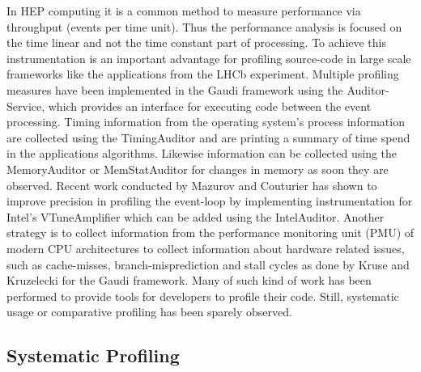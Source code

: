 \documentclass[a4paper]{jpconf}
\begin{document}
In HEP computing it is a common method to measure performance via throughput (events per time unit). Thus the performance analysis is focused on the time linear and not the time constant part of processing. To achieve this instrumentation is an important advantage for profiling source-code in large scale frameworks like the applications from the LHCb experiment. Multiple profiling measures have been implemented in the Gaudi framework using the Auditor-Service, which provides an interface for executing code between the event processing.
\newline
Timing information from the operating system's process information are collected using the TimingAuditor and are printing a summary of time spend in the applications algorithms. Likewise information can be collected using the MemoryAuditor or MemStatAuditor for changes in memory as soon they are observed. Recent work \cite{intel_auditor} conducted by Mazurov and Couturier has shown to improve precision in profiling the event-loop by implementing instrumentation for Intel's  VTune\texttrademark Amplifier which can be added using the IntelAuditor. Another strategy is to collect information from the performance monitoring unit (PMU) of modern CPU architectures to collect information about hardware related issues, such as cache-misses, branch-misprediction and stall cycles as done by Kruse and Kruzelecki \cite{modular_monitoring} for the Gaudi framework.
\newline
Many of such kind of work has been performed to provide tools for developers to profile their code. Still, systematic usage or comparative profiling has been sparely observed.

\subsection{Systematic Profiling}
\label{sec:integrated_profiling}
\end{document}
